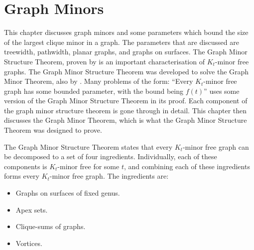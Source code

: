 \chapter{Graph Minors}\label{chap:gmst}
This chapter discusses graph minors and some parameters which bound the size of the largest clique minor in a graph. The parameters that are discussed are treewidth, pathwidth, planar graphs, and graphs on surfaces. 
The Graph Minor Structure Theorem, proven by \textcite{robertsonGraphMinorsXVI2003} is an important characterisation of $K_t$-minor free graphs. The Graph Minor Structure Theorem was developed to solve the Graph Minor Theorem, also by \textcite{robertsonGraphMinorsXX2004}. Many problems of the form: ``Every $K_t$-minor free graph has some bounded parameter, with the bound being $f(t)$'' uses some version of the Graph Minor Structure Theorem in its proof. 
Each component of the graph minor structure theorem is gone through in detail. This chapter then discusses the Graph Minor Theorem, which is what the Graph Minor Structure Theorem was designed to prove.

The Graph Minor Structure Theorem states that every $K_t$-minor free graph can be decomposed to a set of four ingredients. Individually, each of these components is $K_t$-minor free for some $t$, and combining each of these ingredients forms every $K_t$-minor free graph. The ingredients are:
\begin{itemize}
	\item Graphs on surfaces of fixed genus.
	\item Apex sets.
	\item Clique-sums of graphs.
	\item Vortices.
\end{itemize}












\newpage
